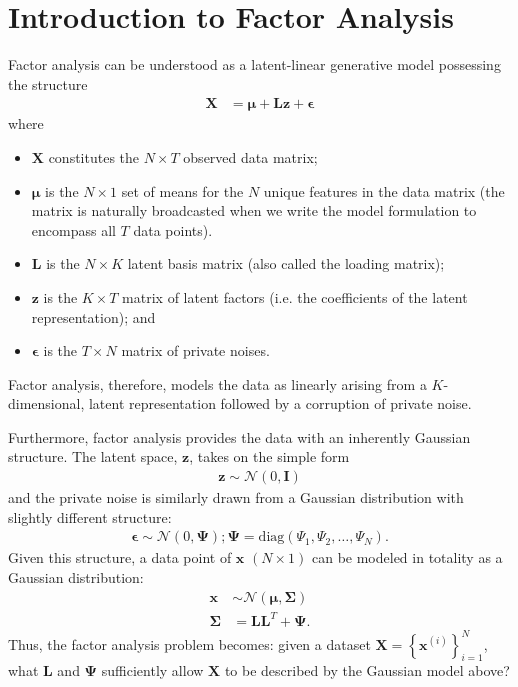 \documentclass[12pt]{article}
\begin{document}
\section{Introduction to Factor Analysis}
Factor analysis can be understood as a latent-linear generative model possessing the structure
\begin{align}
	\mathbf{X} &= \boldsymbol{\mu} + \mathbf{L} \mathbf{z} + \boldsymbol{\epsilon}
\end{align}
where 
\begin{itemize}
\item $\mathbf{X}$ constitutes the $N\times T$ observed data matrix;
\item $\boldsymbol{\mu}$ is the $N\times 1$ set of means for the $N$ unique features in the data matrix (the matrix is naturally broadcasted when we write the model formulation to encompass all $T$ data points).
\item  $\mathbf{L}$ is the $N\times K$ latent basis matrix (also called the loading matrix);
\item  $\mathbf{z}$ is the $K\times T$ matrix of latent factors (i.e. the coefficients of the latent representation); and
\item $\boldsymbol{\epsilon}$ is the $T\times N$ matrix of private noises.
\end{itemize}
Factor analysis, therefore, models the data as linearly arising from a $K$-dimensional, latent representation followed by a corruption of private noise.

Furthermore, factor analysis provides the data with an inherently Gaussian structure. The latent space, $\mathbf{z}$, takes on the simple form
\begin{align}
\mathbf{z} \sim \mathcal{N}(0, \mathbf{I})
\end{align}
and the private noise is similarly drawn from a Gaussian distribution with slightly different structure:
\begin{align}
\boldsymbol{\epsilon} \sim \mathcal{N}(0, \boldsymbol{\Psi}); \boldsymbol{\Psi} = \text{diag}\left(\Psi_1, \Psi_2, \ldots, \Psi_N\right).
\end{align}
Given this structure, a data point of $\mathbf{x}$ $(N\times 1)$ can be modeled in totality as a Gaussian distribution:
\begin{align}
	\mathbf{x} &\sim \mathcal{N}(\boldsymbol{\mu}, \boldsymbol{\Sigma}) \\
	\boldsymbol{\Sigma} &= \mathbf{LL}^T + \boldsymbol{\Psi}.
\end{align}
Thus, the factor analysis problem becomes: given a dataset $\mathbf{X} = \left\{\mathbf{x}^{(i)}\right\}_{i=1}^N$, what  $\mathbf{L}$ and $\boldsymbol{\Psi}$ sufficiently allow $\mathbf{X}$ to be described by the Gaussian model above?
\end{document}
